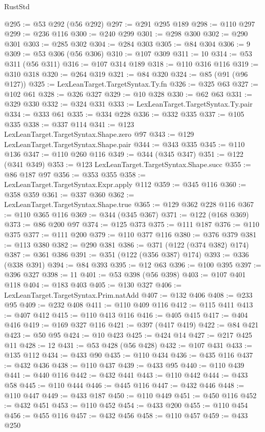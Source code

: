 \begin{lexlean}{RustStd}
\begin{coremodule}
@295 := @53 @292 (@56 @292)
@297 := @291 @295 @189
@298 := @110 @297
@299 := @236 @116
@300 := @240 @299
@301 := @298 @300
@302 := @290 @301
@303 := @285 @302
@304 := @284 @303
@305 := @84 @304
@306 := 9
@309 := @53 @306 (@56 @306)
@310 := @107 @309
@311 := 10
@314 := @53 @311 (@56 @311)
@316 := @107 @314 @189
@318 := @110 @316 @116
@319 := @310 @318
@320 := @264 @319
@321 := @84 @320
@324 := @85 (@91 (@96 @127))
@325 := LexLeanTarget.TargetSyntax.Ty.fn
@326 := @325 @63
@327 := @102 @61
@328 := @326 @327
@329 := @10 @328
@330 := @62 @63
@331 := @329 @330
@332 := @324 @331
@333 := LexLeanTarget.TargetSyntax.Ty.pair
@334 := @333 @61
@335 := @334 @228
@336 := @332 @335
@337 := @105 @335
@338 := @337 @114
@341 := @123 LexLeanTarget.TargetSyntax.Shape.zero @97
@343 := @129 LexLeanTarget.TargetSyntax.Shape.pair
@344 := @343 @335
@345 := @110 @136
@347 := @110 @260 @116
@349 := @344 (@345 @347)
@351 := @122 (@341 @349)
@353 := @123 LexLeanTarget.TargetSyntax.Shape.succ
@355 := @86 @187 @97
@356 := @353 @355
@358 := LexLeanTarget.TargetSyntax.Expr.apply @112
@359 := @345 @116
@360 := @358 @359
@361 := @337 @360
@362 := LexLeanTarget.TargetSyntax.Shape.true
@365 := @129 @362 @228 @116
@367 := @110 @365 @116
@369 := @344 (@345 @367)
@371 := @122 (@168 @369)
@373 := @86 @200 @97
@374 := @125 @373
@375 := @111 @187
@376 := @110 @375
@377 := @111 @200
@379 := @110 @377 @116
@380 := @376 @379
@381 := @113 @380
@382 := @290 @381
@386 := @371 (@122 (@374 @382) @174)
@387 := @361 @386
@391 := @351 (@122 (@356 @387) @174)
@393 := @336 (@338 @391)
@394 := @84 @393
@395 := @12 @63
@396 := @100 @395
@397 := @396 @327
@398 := 11
@401 := @53 @398 (@56 @398)
@403 := @107 @401 @118
@404 := @183 @403
@405 := @130 @327
@406 := LexLeanTarget.TargetSyntax.Prim.natAdd
@407 := @132 @406
@408 := @233 @95
@409 := @232 @408
@411 := @110 @409 @116
@412 := @115 @411
@413 := @407 @412
@415 := @110 @413 @116
@416 := @405 @415
@417 := @404 @416
@419 := @169 @327 @116
@421 := @397 (@417 @419)
@422 := @84 @421
@423 := @50 @95
@424 := @10 @423
@425 := @424 @14
@427 := @217 @425 @11
@428 := 12
@431 := @53 @428 (@56 @428)
@432 := @107 @431
@433 := @135 @112
@434 := @433 @90
@435 := @110 @434
@436 := @435 @116
@437 := @432 @436
@438 := @110 @437
@439 := @433 @95
@440 := @110 @439
@441 := @440 @116
@442 := @432 @441
@443 := @110 @442
@444 := @433 @58
@445 := @110 @444
@446 := @445 @116
@447 := @432 @446
@448 := @110 @447
@449 := @433 @187
@450 := @110 @449
@451 := @450 @116
@452 := @432 @451
@453 := @110 @452
@454 := @433 @200
@455 := @110 @454
@456 := @455 @116
@457 := @432 @456
@458 := @110 @457
@459 := @433 @250

\end{coremodule}
\end{lexlean}
